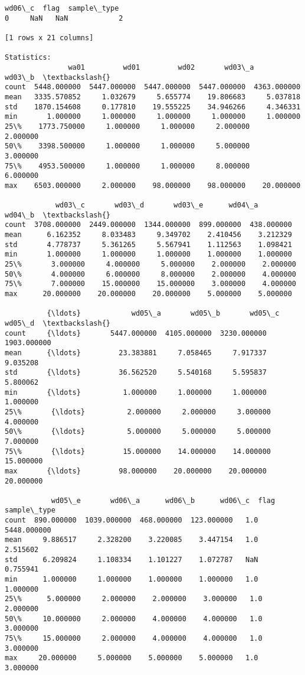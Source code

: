\documentclass[11pt]{article}
\begin{document}
\begin{Verbatim}[commandchars=\\\{\}]
   wd06\_c  flag  sample\_type  
0     NaN   NaN            2  

[1 rows x 21 columns]

Statistics: 
               wa01         wd01         wd02       wd03\_a       wd03\_b  \textbackslash{}
count  5448.000000  5447.000000  5447.000000  5447.000000  4363.000000   
mean   3335.570852     1.032679     5.655774    19.806683     5.037818   
std    1870.154608     0.177810    19.555225    34.946266     4.346331   
min       1.000000     1.000000     1.000000     1.000000     1.000000   
25\%    1773.750000     1.000000     1.000000     2.000000     2.000000   
50\%    3398.500000     1.000000     1.000000     5.000000     3.000000   
75\%    4953.500000     1.000000     1.000000     8.000000     6.000000   
max    6503.000000     2.000000    98.000000    98.000000    20.000000   

            wd03\_c       wd03\_d       wd03\_e      wd04\_a      wd04\_b  \textbackslash{}
count  3708.000000  2449.000000  1344.000000  899.000000  438.000000   
mean      6.162352     8.033483     9.349702    2.410456    3.212329   
std       4.778737     5.361265     5.567941    1.112563    1.098421   
min       1.000000     1.000000     1.000000    1.000000    1.000000   
25\%       3.000000     4.000000     5.000000    2.000000    2.000000   
50\%       4.000000     6.000000     8.000000    2.000000    4.000000   
75\%       7.000000    15.000000    15.000000    3.000000    4.000000   
max      20.000000    20.000000    20.000000    5.000000    5.000000   

          {\ldots}            wd05\_a       wd05\_b       wd05\_c       wd05\_d  \textbackslash{}
count     {\ldots}       5447.000000  4105.000000  3230.000000  1903.000000   
mean      {\ldots}         23.383881     7.058465     7.917337     9.035208   
std       {\ldots}         36.562520     5.540168     5.595837     5.800062   
min       {\ldots}          1.000000     1.000000     1.000000     1.000000   
25\%       {\ldots}          2.000000     2.000000     3.000000     4.000000   
50\%       {\ldots}          5.000000     5.000000     5.000000     7.000000   
75\%       {\ldots}         15.000000    14.000000    14.000000    15.000000   
max       {\ldots}         98.000000    20.000000    20.000000    20.000000   

           wd05\_e       wd06\_a      wd06\_b      wd06\_c  flag  sample\_type  
count  890.000000  1039.000000  468.000000  123.000000   1.0  5448.000000  
mean     9.886517     2.328200    3.220085    3.447154   1.0     2.515602  
std      6.209824     1.108334    1.101227    1.072787   NaN     0.755941  
min      1.000000     1.000000    1.000000    1.000000   1.0     1.000000  
25\%      5.000000     2.000000    2.000000    3.000000   1.0     2.000000  
50\%     10.000000     2.000000    4.000000    4.000000   1.0     3.000000  
75\%     15.000000     2.000000    4.000000    4.000000   1.0     3.000000  
max     20.000000     5.000000    5.000000    5.000000   1.0     3.000000  


\end{Verbatim}
\end{document}
